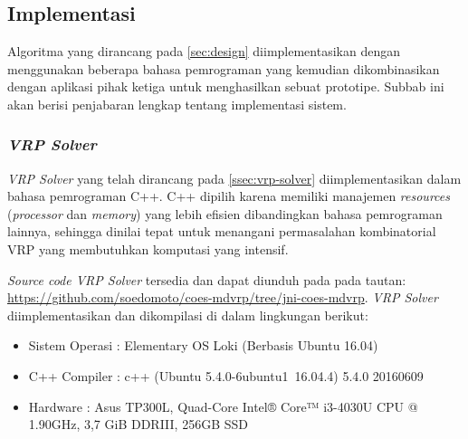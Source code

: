 \chapter{\babLima}


\newcommand\MyHead[2]{%
	\multicolumn{1}{l}{\parbox{#1}{\centering #2}}
}


\section{Implementasi}
\label{sec:implementation}
Algoritma yang dirancang pada \autoref{sec:design} diimplementasikan dengan menggunakan beberapa bahasa pemrograman yang kemudian dikombinasikan dengan aplikasi pihak ketiga untuk menghasilkan sebuat prototipe. Subbab ini akan berisi penjabaran lengkap tentang implementasi sistem. 


\subsection{\textit{VRP Solver}}

\textit{VRP Solver} yang telah dirancang pada \autoref{ssec:vrp-solver} diimplementasikan dalam bahasa pemrograman C++. C++ dipilih karena memiliki manajemen \textit{resources} (\textit{processor} dan \textit{memory}) yang lebih efisien dibandingkan bahasa pemrograman lainnya, sehingga dinilai tepat untuk menangani permasalahan kombinatorial VRP yang membutuhkan komputasi yang intensif. 

\textit{Source code VRP Solver} tersedia dan dapat diunduh pada pada tautan: \url{https://github.com/soedomoto/coes-mdvrp/tree/jni-coes-mdvrp}. \textit{VRP Solver} diimplementasikan dan dikompilasi di dalam lingkungan berikut:
\begin{itemize}
	\item Sistem Operasi		: Elementary OS Loki (Berbasis Ubuntu 16.04)
	\item C++ Compiler			: c++ (Ubuntu 5.4.0-6ubuntu1~16.04.4) 5.4.0 20160609
	\item Hardware				: Asus TP300L, Quad-Core Intel® Core™ i3-4030U CPU @ 1.90GHz, 3,7 GiB DDRIII, 256GB SSD
\end{itemize}


